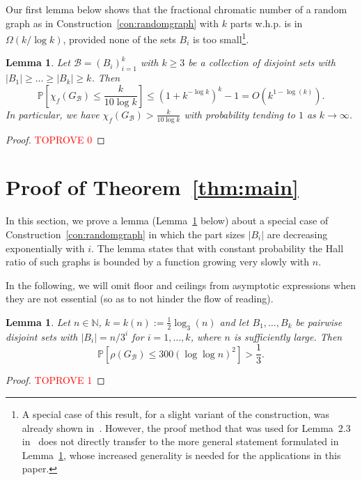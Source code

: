 \documentclass[a4paper,10pt]{amsart}
\newtheorem{lemma}[theorem]{Lemma}
\begin{document}
Our first lemma below shows that the fractional chromatic number of a random graph as in Construction~\ref{con:randomgraph} with $k$ parts w.h.p. is in $\Omega(k/\log k)$, provided none of the sets $B_i$ is too small\footnote{A special case of this result, for a slight variant of the construction, was already shown in~\cite[Lemma 2.3]{janzer}. However, the proof method that was used for Lemma~2.3 in~\cite{janzer} does not directly transfer to the more general statement formulated in Lemma~\ref{lem:fracchrom}, whose increased generality is needed for the applications in this paper.}. 

\begin{lemma}\label{lem:fracchrom}
Let $\mathcal{B}=(B_i)_{i=1}^{k}$ with $k\ge 3$ be a collection of disjoint sets with $|B_1|\ge \dots\ge |B_k|\ge k$. Then
$$\mathbb{P}\left[\chi_f(G_{\mathcal{B}})\le \frac{k}{10\log k}\right] \le \left(1+k^{-\log k}\right)^k-1=O(k^{1-\log(k)}).$$ In particular, we have $\chi_f(G_{\mathcal{B}})> \frac{k}{10\log k}$ with probability tending to $1$ as $k\rightarrow \infty$.
\end{lemma}
\begin{proof}\textcolor{red}{TOPROVE 0}\end{proof}

\section{Proof of Theorem~\ref{thm:main}}\label{sec:main1}

In this section, we prove a lemma (Lemma~\ref{lem:smallish} below) about a special case of Construction~\ref{con:randomgraph} in which the part sizes $|B_i|$ are decreasing exponentially with $i$. The lemma states that with constant probability the Hall ratio of such graphs is bounded by a function growing very slowly with $n$.

In the following, we will omit floor and ceilings from asymptotic expressions when they are not essential (so as to not hinder the flow of reading). 

\begin{lemma}\label{lem:smallish}
Let $n\in \mathbb{N}$,  $k=k(n):=\frac{1}{2}\log_{3}(n)$ and let $B_1,\ldots,B_k$ be pairwise disjoint sets with $|B_i|=n/3^i$ for $i=1,\ldots,k$, where $n$ is sufficiently large. Then $$\mathbb{P}[\rho(G_{\mathcal{B}})\le 300 (\log \log n)^2]>\frac{1}{3}.$$
\end{lemma}
\begin{proof}\textcolor{red}{TOPROVE 1}\end{proof}
\end{document}
